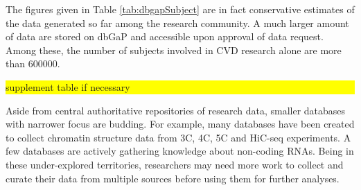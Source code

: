 \documentclass[letter]{bioinfo}
\newcommand{\todo}[1]{\colorbox{yellow}{\parbox{1\linewidth}{#1}}}
\begin{document}
The figures given in Table \ref{tab:dbgapSubject} are in fact conservative estimates of the data generated so far among the research community. A much larger amount of data are stored on dbGaP and accessible upon approval of data request. Among these, the number of subjects involved in CVD research alone are more than 600000. %

\todo{supplement table if necessary}

Aside from central authoritative repositories of research data, smaller databases with narrower focus are budding. For example, many databases have been created to collect chromatin structure data from 3C, 4C, 5C and HiC-seq experiments. A few databases are actively gathering knowledge about non-coding RNAs. Being in these under-explored territories, researchers may need more work to collect and curate their data from multiple sources before using them for further analyses.
\end{document}
